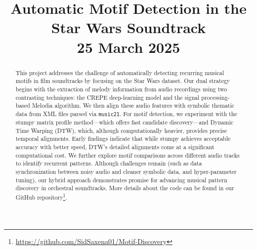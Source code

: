 \documentclass[conference]{IEEEtran}
\begin{document}
\title{Automatic Motif Detection in the Star Wars Soundtrack\\
\vspace{0.2cm}
{\footnotesize 25 March 2025}}

\author{
\and
{}
\and
{}
}

\maketitle

\begin{abstract}
This project addresses the challenge of automatically detecting recurring musical motifs in film soundtracks by focusing on the Star Wars dataset. Our dual strategy begins with the extraction of melody information from audio recordings using two contrasting techniques: the CREPE deep-learning model and the signal processing-based Melodia algorithm. We then align these audio features with symbolic thematic data from XML files parsed via \texttt{music21}. For motif detection, we experiment with the stumpy matrix profile method—which offers fast candidate discovery—and Dynamic Time Warping (DTW), which, although computationally heavier, provides precise temporal alignments. Early findings indicate that while stumpy achieves acceptable accuracy with better speed, DTW’s detailed alignments come at a significant computational cost. We further explore motif comparisons across different audio tracks to identify recurrent patterns. Although challenges remain (such as data synchronization between noisy audio and cleaner symbolic data, and hyper-parameter tuning), our hybrid approach demonstrates promise for advancing musical pattern discovery in orchestral soundtracks.
More details about the code can be found in our GitHub repository\footnote{\url{https://github.com/SidSaxena01/Motif-Discovery}\label{foot:catalogue}}.
\end{abstract}
\end{document}
